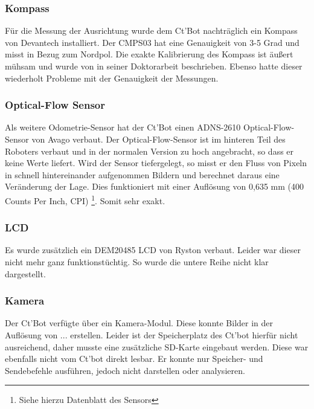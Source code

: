 \documentclass[a4paper,cleardoubleempty,BCOR1cm]{book}
\begin{document}
\subsubsection{Kompass}
Für die Messung der Ausrichtung wurde dem Ct'Bot nachträglich ein Kompass von Devantech installiert. Der CMPS03 hat eine Genauigkeit von 3-5 Grad und misst in Bezug zum Nordpol. Die exakte Kalibrierung des Kompass ist äußert mühsam und wurde von \cite{Hofmeister} in seiner Doktorarbeit beschrieben. Ebenso hatte dieser wiederholt Probleme mit der Genauigkeit der Messungen. 

\subsubsection{Optical-Flow Sensor}
Als weitere Odometrie-Sensor hat der Ct'Bot einen ADNS-2610 Optical-Flow-Sensor von Avago verbaut. Der Optical-Flow-Sensor ist im hinteren Teil des Roboters verbaut und in der normalen Version zu hoch angebracht, so dass er keine Werte liefert. Wird der Sensor tiefergelegt, so misst er den Fluss von Pixeln in schnell hintereinander aufgenommen Bildern und berechnet daraus eine Veränderung der Lage. Dies funktioniert mit einer Auflösung von 0,635 mm (400 Counts Per Inch, CPI) \footnote{Siehe hierzu Datenblatt des Sensors}. Somit sehr exakt. 

\subsubsection{LCD}
Es wurde zusätzlich ein DEM20485 LCD von Ryston verbaut. Leider war dieser nicht mehr ganz funktionstüchtig. So wurde die untere Reihe nicht klar dargestellt. 

\subsubsection{Kamera}
Der Ct'Bot verfügte über ein Kamera-Modul. Diese konnte Bilder in der Auflösung von ... erstellen. Leider ist der Speicherplatz des Ct'bot hierfür nicht ausreichend, daher musste eine zusätzliche SD-Karte eingebaut werden. Diese war ebenfalls nicht vom Ct'bot direkt lesbar. Er konnte nur Speicher- und Sendebefehle ausführen, jedoch nicht darstellen oder analysieren. 
\end{document}
